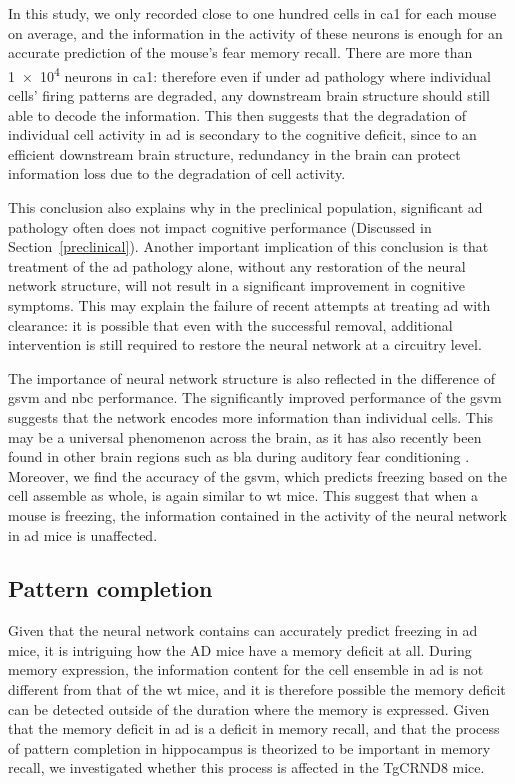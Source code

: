 In this study, we only recorded close to one hundred cells in \gls{ca1} for each mouse on average, and the information in the activity of these neurons is enough for an accurate prediction of the mouse's fear memory recall. There are more than \num{1e4} neurons in \gls{ca1}: therefore even if under \gls{ad} pathology where individual cells' firing patterns are degraded, any downstream brain structure should still able to decode the information. This then suggests that the degradation of individual cell activity in \gls{ad} is secondary to the cognitive deficit, since to an efficient downstream brain structure, redundancy in the brain can protect information loss due to the degradation of cell activity. 

This conclusion also explains why in the preclinical population, significant \gls{ad} pathology often does not impact cognitive performance (Discussed in Section~\ref{preclinical}). Another important implication of this conclusion is that treatment of the \gls{ad} pathology alone, without any restoration of the neural network structure, will not result in a significant improvement in cognitive symptoms. This may explain the failure of recent attempts at treating \gls{ad} with \abeta{} clearance: it is possible that even with the successful \abeta{} removal, additional intervention is still required to restore the neural network at a circuitry level.

The importance of neural network structure is also reflected in the difference of \gls{gsvm} and \gls{nbc} performance. The significantly improved performance of the \gls{gsvm} suggests that the network encodes more information than individual cells. This may be a universal phenomenon across the brain, as it has also recently been found in other brain regions such as \gls{bla} during auditory fear conditioning \citep{grewe17}. Moreover, we find the accuracy of the \gls{gsvm}, which predicts freezing based on the cell assemble as whole, is again similar to \gls{wt} mice. This suggest that when a mouse is freezing, the information contained in the activity of the neural network in \gls{ad} mice is unaffected. 

\subsection{Pattern completion}

Given that the neural network contains can accurately predict freezing in \gls{ad} mice, it is intriguing how the AD mice have a memory deficit at all. During memory expression, the information content for the cell ensemble in \gls{ad} is not different from that of the \gls{wt} mice, and it is therefore possible the memory deficit can be detected outside of the duration where the memory is expressed. Given that the memory deficit in \gls{ad} is a deficit in memory recall, and that the process of pattern completion in hippocampus is theorized to be important in memory recall, we investigated whether this process is affected in the TgCRND8 mice.

